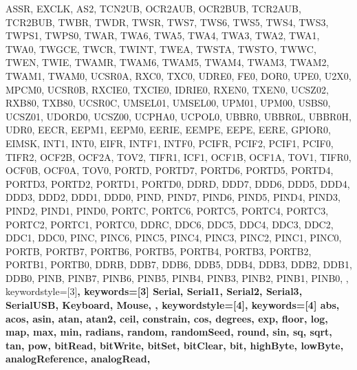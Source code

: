 {{                ASSR, EXCLK, AS2, TCN2UB, OCR2AUB, OCR2BUB, TCR2AUB, TCR2BUB,
                TWBR, TWDR,
                TWSR, TWS7, TWS6, TWS5, TWS4, TWS3, TWPS1, TWPS0,
                TWAR, TWA6, TWA5, TWA4, TWA3, TWA2, TWA1, TWA0, TWGCE,
                TWCR, TWINT, TWEA, TWSTA, TWSTO, TWWC, TWEN, TWIE,
                TWAMR, TWAM6, TWAM5, TWAM4, TWAM3, TWAM2, TWAM1, TWAM0,
                UCSR0A, RXC0, TXC0, UDRE0, FE0, DOR0, UPE0, U2X0, MPCM0,
                UCSR0B, RXCIE0, TXCIE0, IDRIE0, RXEN0, TXEN0, UCSZ02, RXB80, TXB80,
                UCSR0C, UMSEL01, UMSEL00, UPM01, UPM00, USBS0, UCSZ01, UDORD0, UCSZ00, UCPHA0, UCPOL0,
                UBBR0, UBBR0L, UBBR0H,
                UDR0,
                EECR, EEPM1, EEPM0, EERIE, EEMPE, EEPE, EERE,
                GPIOR0,
                EIMSK, INT1, INT0,
                EIFR, INTF1, INTF0,
                PCIFR, PCIF2, PCIF1, PCIF0,
                TIFR2, OCF2B, OCF2A, TOV2, 
                TIFR1, ICF1, OCF1B, OCF1A, TOV1, 
                TIFR0, OCF0B, OCF0A, TOV0, 
                PORTD, PORTD7, PORTD6, PORTD5, PORTD4, PORTD3, PORTD2, PORTD1, PORTD0, 
                DDRD, DDD7, DDD6, DDD5, DDD4, DDD3, DDD2, DDD1, DDD0, 
                PIND, PIND7, PIND6, PIND5, PIND4, PIND3, PIND2, PIND1, PIND0, 
                PORTC, PORTC6, PORTC5, PORTC4, PORTC3, PORTC2, PORTC1, PORTC0, 
                DDRC, DDC6, DDC5, DDC4, DDC3, DDC2, DDC1, DDC0, 
                PINC, PINC6, PINC5, PINC4, PINC3, PINC2, PINC1, PINC0, 
                PORTB, PORTB7, PORTB6, PORTB5, PORTB4, PORTB3, PORTB2, PORTB1, PORTB0, 
                DDRB, DDB7, DDB6, DDB5, DDB4, DDB3, DDB2, DDB1, DDB0, 
                PINB, PINB7, PINB6, PINB5, PINB4, PINB3, PINB2, PINB1, PINB0, 
                },  
% 
%
  keywordstyle=[3]\bfseries\color{arduinoOrange},
  keywords=[3]{  %
                Serial, Serial1, Serial2, Serial3, SerialUSB, Keyboard, Mouse,
                },      
%
%
  keywordstyle=[4]\color{arduinoOrange},
  keywords=[4]{  %
                abs, acos, asin, atan, atan2, ceil, constrain, cos, degrees, exp, 
                floor, log, map, max, min, radians, random, randomSeed, round, sin, 
                sq, sqrt, tan, pow, bitRead, bitWrite, bitSet, bitClear, bit, 
                highByte, lowByte, analogReference, analogRead, 
}}
